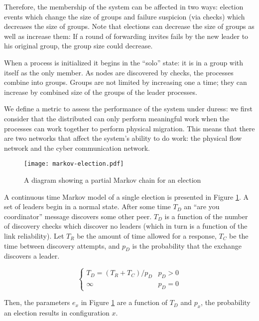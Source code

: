 Therefore, the membership of the system can be affected in two ways: election
events which change the size of groups and failure suspicion (via checks) which
decreases the size of groups. Note that elections can decrease the size of
groups as well as increase them: If a round of forwarding invites fails by the
new leader to his original group, the group size could decrease.

When a process is initialized it begins in the ``solo'' state: it is in a group
with itself as the only member. As nodes are discovered by checks, the
processes combine into groups. Groups are not limited by increasing one a time;
they can increase by combined size of the groups of the leader processes.

We define a metric to assess the performance of the system under duress: we
first consider that the distributed can only perform meaningful work when the
processes can work together to perform physical migration. This means that
there are two networks that affect the system's ability to do work: the
physical flow network and the cyber communication network.


\begin{figure}[!h]
\centering
\texttt{[image: markov-election.pdf]}
\caption{A diagram showing a partial Markov chain for an election}
\label{fig:MARKOVELECTION}
\end{figure}

A continuous time Markov model of a single election is presented in Figure \ref{fig:MARKOVELECTION}.
A set of leaders begin in a normal state. After some time $T_{D}$ an ``are you coordinator''
message discovers some other peer. $T_{D}$ is a function of the number of discovery
checks which discover no leaders (which in turn is a function of the link reliability). Let
$T_{R}$ be the amount of time allowed for a response, $T_{C}$ be the time between
discovery attempts, and $p_{D}$ is the probability that the exchange discovers a leader.

\begin{equation}
\begin{cases}
T_{D} = ( T_{R}+T_{C} ) / p_{D} & p_{D} > 0 \\
\infty & p_{D} = 0
\end{cases}
\end{equation}

Then, the parameters $e_x$ in Figure \ref{fig:MARKOVELECTION} are a function of $T_{D}$ and $p_{x}$,
the probability an election results in configuration $x$.

